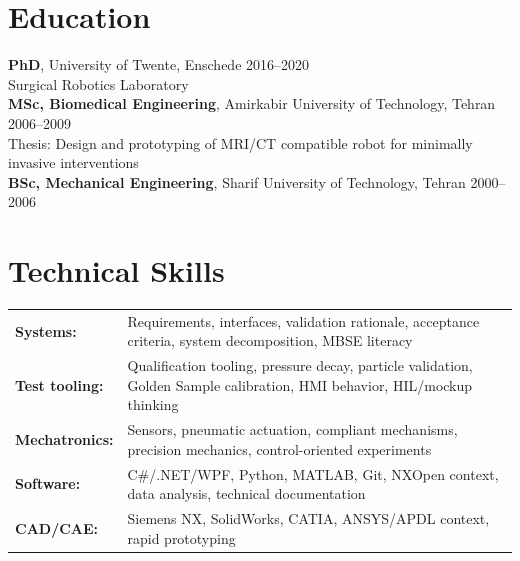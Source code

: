 \documentclass[10pt,a4paper]{article}
\begin{document}
\section{Education}

\textbf{PhD}, University of Twente, Enschede \hfill 2016--2020 \\
{\small Surgical Robotics Laboratory } \\[2pt]
\textbf{MSc, Biomedical Engineering}, Amirkabir University of Technology, Tehran \hfill 2006--2009 \\
{\small Thesis: Design and prototyping of MRI/CT compatible robot for minimally invasive interventions} \\[2pt]
\textbf{BSc, Mechanical Engineering}, Sharif University of Technology, Tehran \hfill 2000--2006

\section{Technical Skills}
{\small
\begin{tabularx}{\textwidth}{@{}lX@{}}
 \textbf{Systems:} & Requirements, interfaces, validation rationale, acceptance criteria, system decomposition, MBSE literacy \\
 \textbf{Test tooling:} & Qualification tooling, pressure decay, particle validation, Golden Sample calibration, HMI behavior, HIL/mockup thinking \\
 \textbf{Mechatronics:} & Sensors, pneumatic actuation, compliant mechanisms, precision mechanics, control-oriented experiments \\
 \textbf{Software:} & C\#/.NET/WPF, Python, MATLAB, Git, NXOpen context, data analysis, technical documentation \\
 \textbf{CAD/CAE:} & Siemens NX, SolidWorks, CATIA, ANSYS/APDL context, rapid prototyping \\
\end{tabularx}
}
\end{document}
